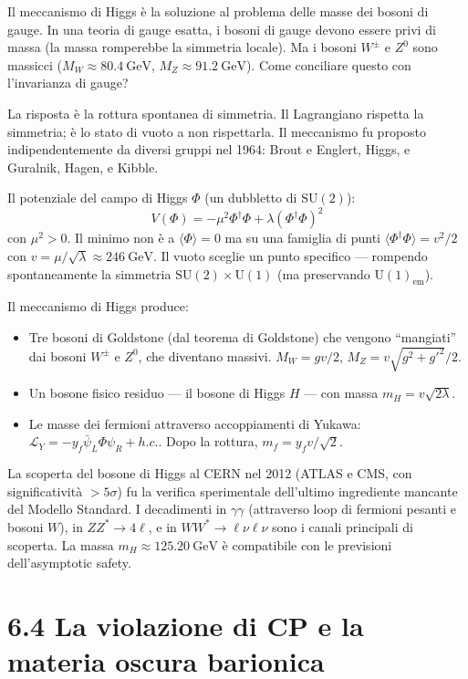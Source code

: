 \documentclass[11.5pt,a4paper,openany]{book}
\theoremstyle{remark}
\begin{document}
Il meccanismo di Higgs è la soluzione al problema delle masse dei bosoni di gauge. In una teoria di gauge esatta, i bosoni di gauge devono essere privi di massa (la massa romperebbe la simmetria locale). Ma i bosoni $W^\pm$ e $Z^0$ sono massicci ($M_W \approx 80.4\ \text{GeV}$, $M_Z \approx 91.2\ \text{GeV}$). Come conciliare questo con l'invarianza di gauge?

La risposta è la rottura spontanea di simmetria. Il Lagrangiano rispetta la simmetria; è lo stato di vuoto a non rispettarla. Il meccanismo fu proposto indipendentemente da diversi gruppi nel 1964: Brout e Englert, Higgs, e Guralnik, Hagen, e Kibble.

Il potenziale del campo di Higgs $\Phi$ (un dubbletto di $\mathrm{SU}(2)$):
\[
V(\Phi) = -\mu^2 \Phi^\dagger\Phi + \lambda(\Phi^\dagger\Phi)^2
\]
con $\mu^2 > 0$. Il minimo non è a $\langle\Phi\rangle = 0$ ma su una famiglia di punti $\langle\Phi^\dagger\Phi\rangle = v^2/2$ con $v = \mu/\sqrt{\lambda} \approx 246\ \text{GeV}$. Il vuoto sceglie un punto specifico --- rompendo spontaneamente la simmetria $\mathrm{SU}(2) \times \mathrm{U}(1)$ (ma preservando $\mathrm{U}(1)_{\text{em}}$).

Il meccanismo di Higgs produce:
\begin{itemize}
\item Tre bosoni di Goldstone (dal teorema di Goldstone) che vengono ``mangiati'' dai bosoni $W^\pm$ e $Z^0$, che diventano massivi. $M_W = gv/2$, $M_Z = v\sqrt{g^2+g'^2}/2$.
\item Un bosone fisico residuo --- il bosone di Higgs $H$ --- con massa $m_H = v\sqrt{2\lambda}$.
\item Le masse dei fermioni attraverso accoppiamenti di Yukawa: $\mathcal{L}_Y = -y_f \bar\psi_L \Phi \psi_R + h.c.$. Dopo la rottura, $m_f = y_f v/\sqrt{2}$.
\end{itemize}

La scoperta del bosone di Higgs al CERN nel 2012 (ATLAS e CMS, con significatività $> 5\sigma$) fu la verifica sperimentale dell'ultimo ingrediente mancante del Modello Standard. I decadimenti in $\gamma\gamma$ (attraverso loop di fermioni pesanti e bosoni $W$), in $ZZ^* \to 4\ell$, e in $WW^* \to \ell\nu\ell\nu$ sono i canali principali di scoperta. La massa $m_H \approx 125.20\ \text{GeV}$ è compatibile con le previsioni dell'asymptotic safety.

\section{6.4 La violazione di CP e la materia oscura barionica}
\end{document}
